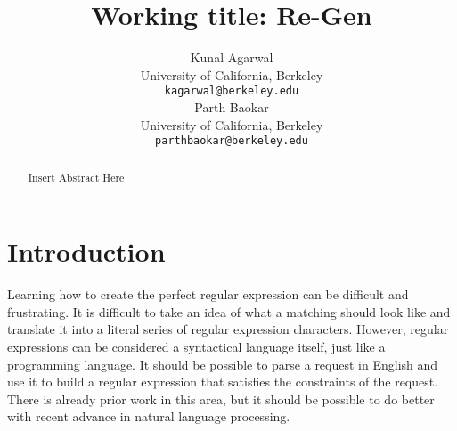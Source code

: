 \documentclass[11pt,a4paper]{article}
\title{Working title: Re-Gen}
\author{Kunal Agarwal \\
  University of California, Berkeley \\
  \texttt{kagarwal@berkeley.edu} \\\And
  Parth Baokar \\
  University of California, Berkeley \\
  \texttt{parthbaokar@berkeley.edu} \\}
\date{}
\begin{document}
\maketitle
\begin{abstract}
Insert Abstract Here
\end{abstract}



\section{Introduction}

Learning how to create the perfect regular expression can be difficult and frustrating. It is difficult to take an idea of what a matching should look like and translate it into a literal series of regular expression characters. However, regular expressions can be considered a syntactical language itself, just like a programming language. It should be possible to parse a request in English and use it to build a regular expression that satisfies the constraints of the request. There is already prior work in this area, but it should be possible to do better with recent advance in natural language processing.
\end{document}
